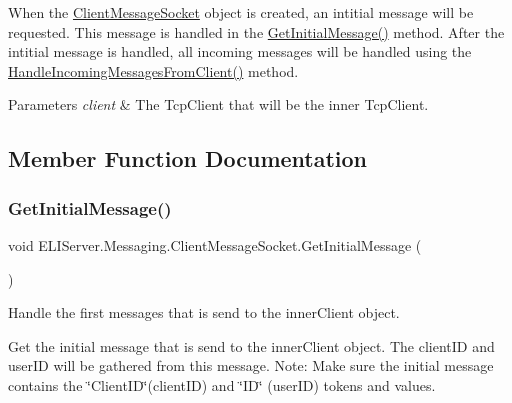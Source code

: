When the \hyperlink{class_e_l_i_server_1_1_messaging_1_1_client_message_socket}{Client\+Message\+Socket} object is created, an intitial message will be requested. This message is handled in the \hyperlink{class_e_l_i_server_1_1_messaging_1_1_client_message_socket_ae337f033eec166081fc56f6a35a22c8f}{Get\+Initial\+Message()} method. After the intitial message is handled, all incoming messages will be handled using the \hyperlink{class_e_l_i_server_1_1_messaging_1_1_client_message_socket_a79f0022875996b0902f22bf3db2eed9b}{Handle\+Incoming\+Messages\+From\+Client()} method. 


\begin{DoxyParams}{Parameters}
{\em client} & The Tcp\+Client that will be the inner Tcp\+Client.\\
\hline
\end{DoxyParams}


\subsection{Member Function Documentation}
\mbox{\label{class_e_l_i_server_1_1_messaging_1_1_client_message_socket_ae337f033eec166081fc56f6a35a22c8f}} 
\subsubsection{\texorpdfstring{Get\+Initial\+Message()}{GetInitialMessage()}}
{\footnotesize\ttfamily void E\+L\+I\+Server.\+Messaging.\+Client\+Message\+Socket.\+Get\+Initial\+Message (\begin{DoxyParamCaption}{ }\end{DoxyParamCaption})\hspace{0.3cm}{\ttfamily [inline]}}





Handle the first messages that is send to the inner\+Client object.

Get the initial message that is send to the inner\+Client object. The client\+ID and user\+ID will be gathered from this message. Note\+: Make sure the initial message contains the \char`\"{}\+Client\+I\+D\char`\"{}(client\+ID) and \char`\"{}\+I\+D\char`\"{} (user\+ID) tokens and values. \mbox{\label{class_e_l_i_server_1_1_messaging_1_1_client_message_socket_a22a77525ef761a701c8be319d5e31a50}} 
